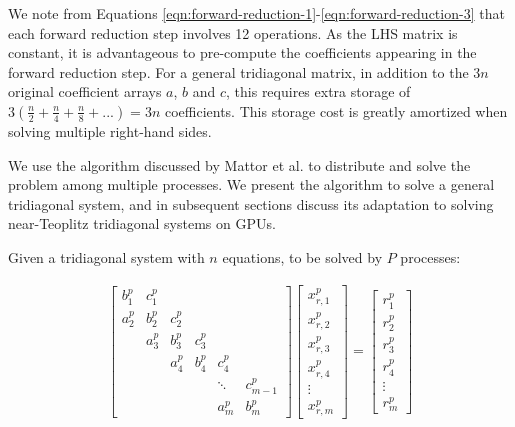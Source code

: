 \documentclass{elsarticle}
\begin{document}



We note from
Equations \ref{eqn:forward-reduction-1}-\ref{eqn:forward-reduction-3}
that each forward reduction step involves 12 operations.
As the LHS matrix is constant,
it is advantageous to pre-compute the coefficients appearing
in the forward reduction step.
For a general tridiagonal matrix,
in addition to the $3n$ original coefficient arrays
$a$, $b$ and $c$,
this requires extra storage of 
$3(\frac{n}{2}+\frac{n}{4}+\frac{n}{8}+...)=3n$
coefficients.
This storage cost is greatly amortized
when solving multiple right-hand sides.

We use the algorithm discussed by Mattor et al.
\cite{mattor1995algorithm}
to distribute and solve the problem among multiple processes. 
We present the algorithm to solve a general tridiagonal system,
and in subsequent sections discuss its adaptation to solving
near-Teoplitz tridiagonal systems on GPUs.

Given a tridiagonal system with  $n$ equations,
to be solved by $P$ processes:

\begin{align}
& \begin{bmatrix}
b_1^p & c_1^p \\
a_2^p & b_2^p & c_2^p \\
      & a_3^p & b_3^p & c_3^p \\
      &       & a_4^p & b_4^p & c_4^p \\
      &       &       &       &  \ddots & c_{m-1}^p\\
      &       &       &       &     a_{m}^p  & b_{m}^p
\end{bmatrix}
\begin{bmatrix}
x_{r,1}^p \\
x_{r,2}^p \\
x_{r,3}^p \\
x_{r,4}^p \\
\vdots \\
x_{r,m}^p
\end{bmatrix}
=
\begin{bmatrix}
r_1^p \\
r_2^p \\
r_3^p \\
r_4^p \\
\vdots \\
r_m^p
\end{bmatrix} & \label{eqn:global-system} 
\end{align}
\end{document}
